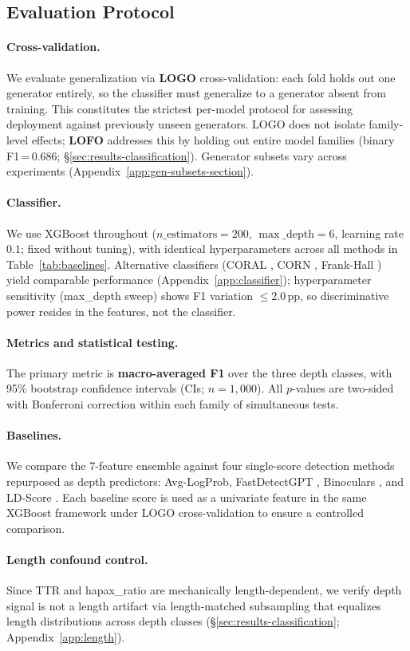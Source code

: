 \subsection{Evaluation Protocol}
\label{sec:evaluation}

\paragraph{Cross-validation.}
 We evaluate generalization via \textbf{LOGO} cross-validation: each fold holds out one generator entirely, so the classifier must generalize to a generator absent from training. This constitutes the strictest per-model protocol for assessing deployment against previously unseen generators.
LOGO does not isolate family-level effects; \textbf{LOFO} addresses this by holding out entire model families (binary F1\,=\,0.686; \S\ref{sec:results-classification}).
Generator subsets vary across experiments (Appendix~\ref{app:gen-subsets-section}).

\paragraph{Classifier.}
 We use XGBoost \cite{xgboost} throughout ($n\_\text{estimators}{=}200$, $\max\_\text{depth}{=}6$, learning rate $0.1$; fixed without tuning), with identical hyperparameters across all methods in Table~\ref{tab:baselines}.
Alternative classifiers (CORAL \cite{coral_ordinal}, CORN \cite{corn_ordinal}, Frank-Hall \cite{frank_hall_ordinal}) yield comparable performance (Appendix~\ref{app:classifier}); hyperparameter sensitivity (max\_depth sweep) shows F1 variation $\leq$2.0\,pp, so discriminative power resides in the features, not the classifier.

\paragraph{Metrics and statistical testing.}
The primary metric is \textbf{macro-averaged F1} over the three depth classes, with 95\% bootstrap confidence intervals (CIs; $n{=}1{,}000$).
All $p$-values are two-sided with Bonferroni correction within each family of simultaneous tests.

\paragraph{Baselines.}
We compare the 7-feature ensemble against four single-score detection methods repurposed as depth predictors: Avg-LogProb, FastDetectGPT \cite{fast_detectgpt}, Binoculars \cite{binoculars}, and LD-Score \cite{ld_score}.
Each baseline score is used as a univariate feature in the same XGBoost framework under LOGO cross-validation to ensure a controlled comparison.

\paragraph{Length confound control.}
Since TTR and hapax\_ratio are mechanically length-dependent, we verify depth signal is not a length artifact via length-matched subsampling that equalizes length distributions across depth classes (\S\ref{sec:results-classification}; Appendix~\ref{app:length}).
